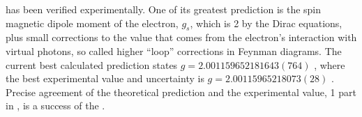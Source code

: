 \QED has been verified experimentally. One of its greatest prediction is the spin magnetic dipole moment of the electron, $g_{s}$, which is 2 by the Dirac equations, plus small corrections to the value that comes from the electron's interaction with virtual photons, so called higher ``loop'' corrections in Feynman diagrams. The current best calculated \QED prediction states $g=2.001159652181643(764)$ \cite{Aoyama:2014sxa}, where the best experimental value and uncertainty is $g = 2.00115965218073(28)$ \cite{Hanneke:2010au}. Precise agreement of the theoretical prediction and the experimental value, 1 part in , is a success of the \QED.

